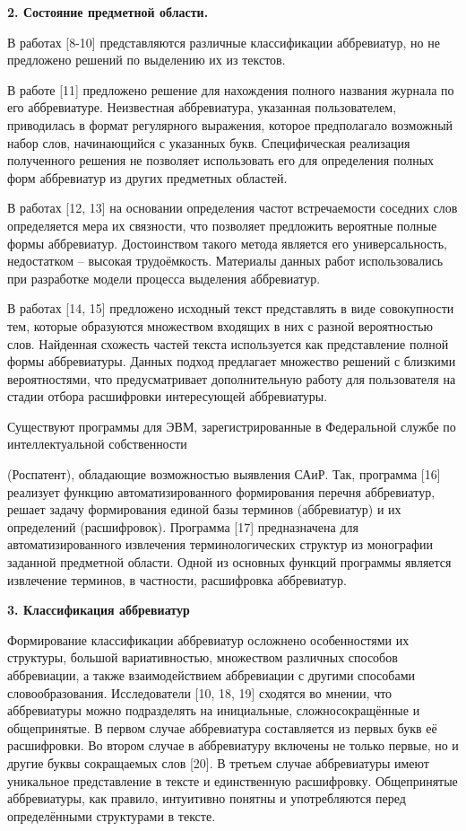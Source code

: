 \documentclass[14pt]{extarticle}
\begin{document}
\textbf{2. Состояние предметной области.}

В работах [8-10] представляются различные классификации аббревиатур, но не предложено решений по выделению их из текстов.

В работе [11] предложено решение для нахождения полного названия журнала по его аббревиатуре. Неизвестная аббревиатура, указанная пользователем, приводилась в формат регулярного выражения, которое предполагало возможный набор слов, начинающийся с указанных букв. Специфическая реализация полученного решения не позволяет использовать его для определения полных форм аббревиатур из других предметных областей.

В работах [12, 13] на основании определения частот встречаемости соседних слов определяется мера их связности, что позволяет предложить вероятные полные формы аббревиатур. Достоинством такого метода является его универсальность, недостатком – высокая трудоёмкость. Материалы данных работ использовались при разработке модели процесса выделения аббревиатур.

В работах [14, 15] предложено исходный текст представлять в виде совокупности тем, которые образуются множеством входящих в них с разной вероятностью слов. Найденная схожесть частей текста используется как представление полной формы аббревиатуры. Данных подход предлагает множество решений с близкими вероятностями, что предусматривает дополнительную работу для пользователя на стадии отбора расшифровки интересующей аббревиатуры.

Существуют программы для ЭВМ, зарегистрированные в Федеральной службе по интеллектуальной собственности 

\newpage

\noindent (Роспатент), обладающие возможностью выявления САиР. Так, программа [16] реализует функцию автоматизированного формирования перечня аббревиатур, решает задачу формирования единой базы терминов (аббревиатур) и их определений (расшифровок). Программа [17] предназначена для автоматизированного извлечения терминологических структур из монографии заданной предметной области. Одной из основных функций программы является извлечение терминов, в частности, расшифровка аббревиатур.

\hspace{1cm}

\textbf{3. Классификация аббревиатур}

Формирование классификации аббревиатур осложнено особенностями их \\
структуры, большой вариативностью, множеством различных способов аббревиации, а также взаимодействием аббревиации с другими способами словообразования. Исследователи [10, 18, 19] сходятся во мнении, что аббревиатуры можно подразделять на инициальные, сложносокращённые и общепринятые. В первом случае аббревиатура составляется из первых букв её расшифровки. Во втором случае в аббревиатуру включены не только первые, но и другие буквы сокращаемых слов [20]. В третьем случае аббревиатуры имеют уникальное представление в тексте и единственную расшифровку. Общепринятые аббревиатуры, как правило, интуитивно понятны и употребляются перед определёнными структурами в тексте.
\end{document}

